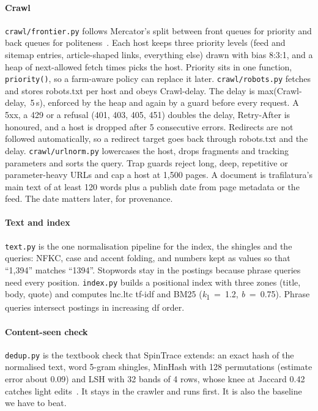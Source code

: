 \documentclass[11pt,a4paper]{article}
\newcommand{\code}[1]{\texttt{#1}}
\begin{document}
\paragraph{Crawl} \code{crawl/frontier.py} follows Mercator's split between front queues for priority and back queues for politeness~\cite{heydon1999}. Each host keeps three priority levels (feed and sitemap entries, article-shaped links, everything else) drawn with bias 8:3:1, and a heap of next-allowed fetch times picks the host. Priority sits in one function, \code{priority()}, so a farm-aware policy can replace it later. \code{crawl/robots.py} fetches and stores robots.txt per host and obeys Crawl-delay. The delay is max(Crawl-delay,~5\,s), enforced by the heap and again by a guard before every request. A 5xx, a 429 or a refusal (401, 403, 405, 451) doubles the delay, Retry-After is honoured, and a host is dropped after 5 consecutive errors. Redirects are not followed automatically, so a redirect target goes back through robots.txt and the delay. \code{crawl/urlnorm.py} lowercases the host, drops fragments and tracking parameters and sorts the query. Trap guards reject long, deep, repetitive or parameter-heavy URLs and cap a host at 1,500 pages. A document is trafilatura's main text of at least 120 words plus a publish date from page metadata or the feed. The date matters later, for provenance.

\paragraph{Text and index} \code{text.py} is the one normalisation pipeline for the index, the shingles and the queries: NFKC, case and accent folding, and numbers kept as values so that ``1,394'' matches ``1394''. Stopwords stay in the postings because phrase queries need every position. \code{index.py} builds a positional index with three zones (title, body, quote) and computes lnc.ltc tf-idf and BM25 (\textit{k}\textsubscript{1}~=~1.2, \textit{b}~=~0.75). Phrase queries intersect postings in increasing df order.

\paragraph{Content-seen check} \code{dedup.py} is the textbook check that SpinTrace extends: an exact hash of the normalised text, word 5-gram shingles, MinHash with 128 permutations (estimate error about 0.09) and LSH with 32 bands of 4 rows, whose knee at Jaccard 0.42 catches light edits~\cite{broder1997,iir2008}. It stays in the crawler and runs first. It is also the baseline we have to beat.
\end{document}

